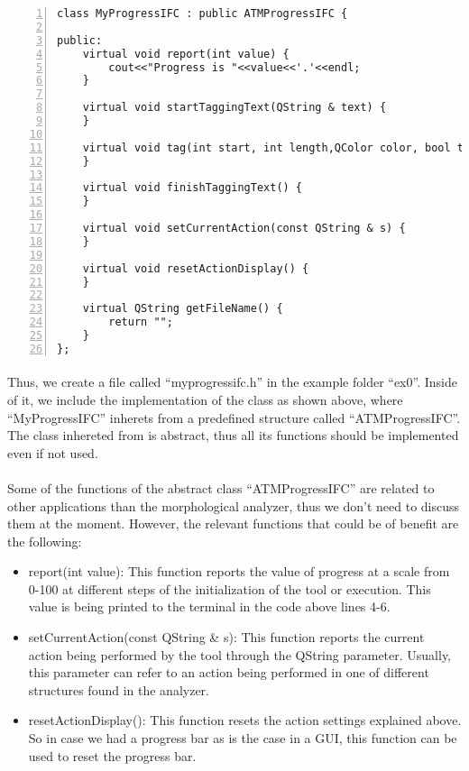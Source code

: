 \documentclass{article}
\begin{document}
\label{vrbtm:myprogressifc}
\begin{Verbatim}[numbers=left]
class MyProgressIFC : public ATMProgressIFC {

public:
    virtual void report(int value) {
        cout<<"Progress is "<<value<<'.'<<endl;
    }

    virtual void startTaggingText(QString & text) {
    }

    virtual void tag(int start, int length,QColor color, bool textcolor=true) {
    }

    virtual void finishTaggingText() {
    }

    virtual void setCurrentAction(const QString & s) {
    }

    virtual void resetActionDisplay() {
    }

    virtual QString getFileName() {
        return "";
    }
};
\end{Verbatim}

\paragraph{}
Thus, we create a file called ``myprogressifc.h'' in the example folder ``ex0''. Inside of it, we include the implementation of the class as shown above, where ``MyProgressIFC'' inherets from a predefined structure called ``ATMProgressIFC''. The class inhereted from is abstract, thus all its functions should be implemented even if not used.

\paragraph{}
Some of the functions of the abstract class ``ATMProgressIFC'' are related to other applications than the morphological analyzer, thus we don't need to discuss them at the moment. However, the relevant functions that could be of benefit are the following:

\begin{itemize}
\item report(int value): This function reports the value of progress at a scale from 0-100 at different steps of the initialization of the tool or execution. This value is being printed to the terminal in the code above lines 4-6.
\item setCurrentAction(const QString \& s): This function reports the current action being performed by the tool through the QString parameter. Usually, this parameter can refer to an action being performed in one of different structures found in the analyzer.
\item resetActionDisplay(): This function resets the action settings explained above. So in case we had a progress bar as is the case in a GUI, this function can be used to reset the progress bar.
\end{itemize}
\end{document}
